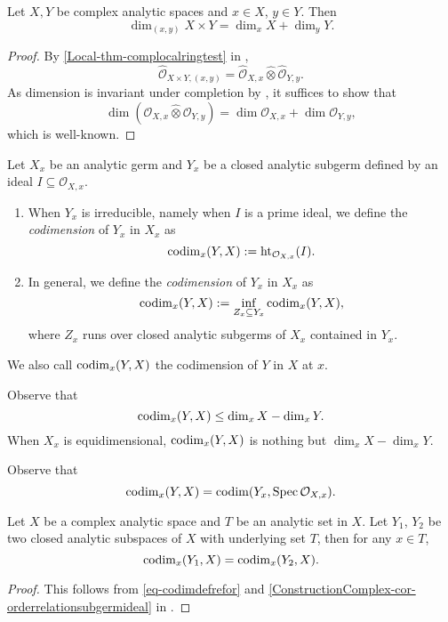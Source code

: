 \begin{proposition}
    Let $X,Y$ be complex analytic spaces and $x\in X$, $y\in Y$. Then
    \[
        \dim_{(x,y)}X\times Y=\dim_x X+\dim_y Y.  
    \]
\end{proposition}
\begin{proof}
    By \cref{Local-thm-complocalringtest} in ,
    \[
        \hat{\mathcal{O}}_{X\times Y,(x,y)}=\hat{\mathcal{O}}_{X,x}\hat{\otimes}\hat{\mathcal{O}}_{Y,y}.  
    \]
    As dimension is invariant under completion by \cite[\href{https://stacks.math.columbia.edu/tag/07NV}{Tag 07NV}]{stacks-project}, it suffices to show that
    \[
        \dim (\mathcal{O}_{X,x}\hat{\otimes} \mathcal{O}_{Y,y}) =\dim \mathcal{O}_{X,x}+\dim \mathcal{O}_{Y,y}, 
    \]
    which is well-known.
\end{proof}

\begin{definition}
    Let $X_x$ be an analytic germ and $Y_x$ be a closed analytic subgerm defined by an ideal $I\subseteq \mathcal{O}_{X,x}$.
    \begin{enumerate}
        \item When $Y_x$ is irreducible, namely when $I$ is a prime ideal, we define the \emph{codimension} of $Y_x$ in $X_x$ as 
            \[
                \operatorname{codim}_x(Y,X):=\operatorname{ht}_{\mathcal{O}_{X,x}}(I).    
            \]
        \item In general, we define the \emph{codimension} of $Y_x$ in $X_x$ as 
        \[
            \operatorname{codim}_x(Y,X):=\inf_{Z_x\subseteq Y_x} \operatorname{codim}_x(Y,X),
        \]
        where $Z_x$ runs over closed analytic subgerms of $X_x$ contained in $Y_x$.
    \end{enumerate}
    We also call $\operatorname{codim}_x(Y,X)$ the codimension of $Y$ in $X$ at $x$.
\end{definition}
Observe that 
\[
    \operatorname{codim}_x(Y,X)\leq \dim_x X-\dim_x Y.
\]
When $X_x$ is equidimensional, $\operatorname{codim}_x(Y,X)$ is nothing but $\dim_x X-\dim_x Y$.

Observe that 
\begin{equation}\label{eq-codimdefrefor}
    \operatorname{codim}_x(Y,X)=\operatorname{codim} (Y_x,\operatorname{Spec} \mathcal{O}_{X,x}).
\end{equation}

\begin{lemma}\label{lma-codimindp}
    Let $X$ be a complex analytic space and $T$ be an analytic set in $X$. Let $Y_1$, $Y_2$ be two closed analytic subspaces of $X$ with underlying set $T$, then for any $x\in T$,
    \[
        \operatorname{codim}_x(Y_1,X)=\operatorname{codim}_x(Y_2,X).
    \]
\end{lemma}
\begin{proof}
    This follows from \eqref{eq-codimdefrefor} and \cref{ConstructionComplex-cor-orderrelationsubgermideal} in .
\end{proof}

